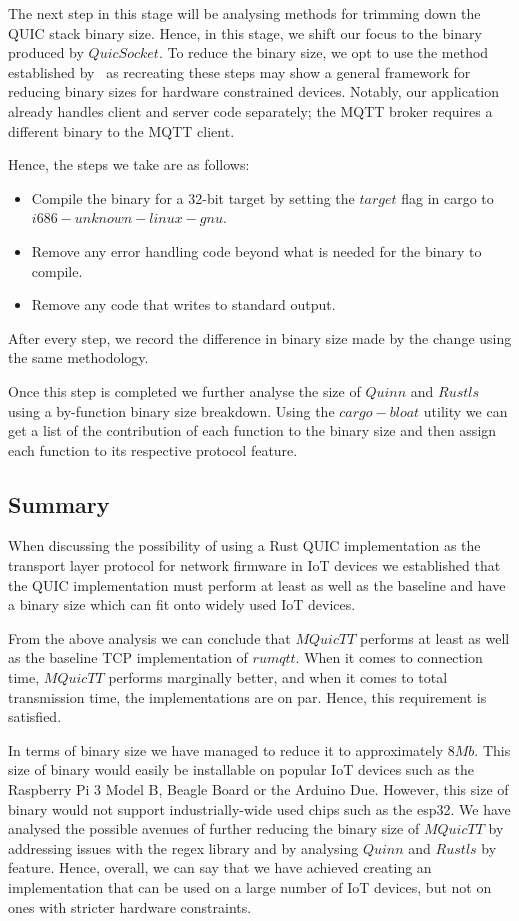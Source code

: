 The next step in this stage will be analysing methods for trimming down the QUIC stack binary size.
Hence, in this stage, we shift our focus to the binary produced by $QuicSocket$.
To reduce the binary size, we opt to use the method established by~\citet{eggert_towards_2020} as recreating these steps may show a general framework for reducing binary sizes for hardware constrained devices.
Notably, our application already handles client and server code separately; the MQTT broker requires a different binary to the MQTT client.

Hence, the steps we take are as follows:

\begin{itemize}
    \item Compile the binary for a 32-bit target by setting the $target$ flag in cargo to $i686-unknown-linux-gnu$.
    \item Remove any error handling code beyond what is needed for the binary to compile.
    \item Remove any code that writes to standard output.
\end{itemize}

After every step, we record the difference in binary size made by the change using the same methodology.

Once this step is completed we further analyse the size of $Quinn$ and $Rustls$ using a by-function binary size breakdown.
Using the $cargo-bloat$ utility we can get a list of the contribution of each function to the binary size and then assign each function to its respective protocol feature.



\subsection{Summary}

When discussing the possibility of using a Rust QUIC implementation as the transport layer protocol for network firmware in IoT devices we established that the QUIC implementation must perform at least as well as the baseline and have a binary size which can fit onto widely used IoT devices.

From the above analysis we can conclude that $MQuicTT$ performs at least as well as the baseline TCP implementation of $rumqtt$.
When it comes to connection time, $MQuicTT$ performs marginally better, and when it comes to total transmission time, the implementations are on par.
Hence, this requirement is satisfied.

In terms of binary size we have managed to reduce it to approximately $8Mb$.
This size of binary would easily be installable on popular IoT devices such as the Raspberry Pi 3 Model B, Beagle Board or the Arduino Due.
However, this size of binary would not support industrially-wide used chips such as the esp32.
We have analysed the possible avenues of further reducing the binary size of $MQuicTT$ by addressing issues with the regex library and by analysing $Quinn$ and $Rustls$ by feature.
Hence, overall, we can say that we have achieved creating an implementation that can be used on a large number of IoT devices, but not on ones with stricter hardware constraints.
